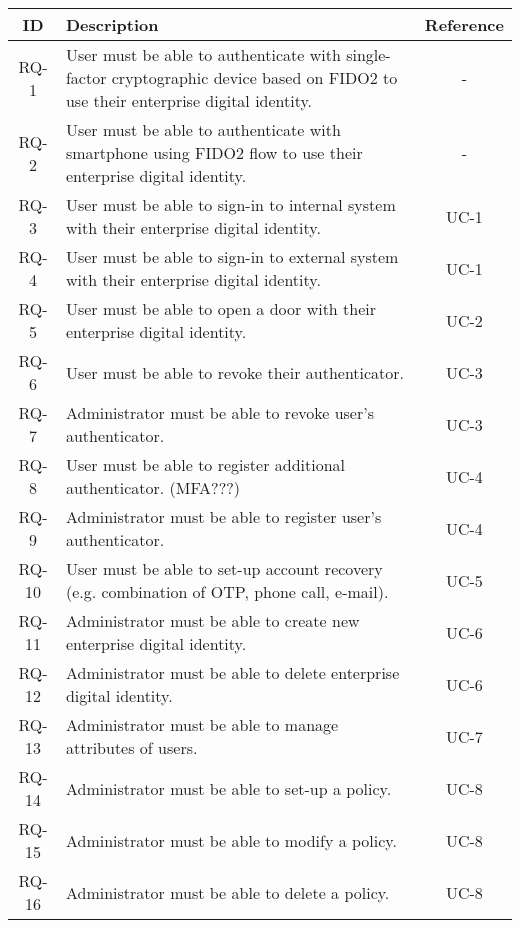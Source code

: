 \begin{table}[H]
    \onehalfspacing
    \centering
    \begin{tabular}{|c|p{12cm}|c|}
    \hline
    \cellcolor[HTML]{CBCEFB}\textbf{ID}&\cellcolor[HTML]{CBCEFB}\textbf{Description}&\cellcolor[HTML]{CBCEFB}\textbf{Reference}\\
    \hline
    RQ-1&User must be able to authenticate with single-factor cryptographic device based on FIDO2 to use their enterprise digital identity.&-\\
    \hline
    RQ-2&User must be able to authenticate with smartphone using FIDO2 flow to use their enterprise digital identity.&-\\
    \hline
    \hline
    RQ-3&User must be able to sign-in to internal system with their enterprise digital identity.&UC-1\\
    \hline
    RQ-4&User must be able to sign-in to external system with their enterprise digital identity.&UC-1\\
    \hline
    \hline
    RQ-5&User must be able to open a door with their enterprise digital identity.&UC-2\\
    \hline
    \hline
    RQ-6&User must be able to revoke their authenticator.&UC-3\\
    \hline
    RQ-7&Administrator must be able to revoke user’s authenticator.&UC-3\\
    \hline
    \hline
    RQ-8&User must be able to register additional authenticator. (MFA???)&UC-4\\
    \hline
    RQ-9&Administrator must be able to register user’s authenticator.&UC-4\\
    \hline
    RQ-10&User must be able to set-up account recovery (e.g. combination of OTP, phone call, e-mail).&UC-5\\
    \hline
    \hline
    RQ-11&Administrator must be able to create new enterprise digital identity.&UC-6\\
    \hline
    RQ-12&Administrator must be able to delete enterprise digital identity.&UC-6\\
    \hline
    \hline
    RQ-13&Administrator must be able to manage attributes of users.&UC-7\\
    \hline
    \hline
    RQ-14&Administrator must be able to set-up a policy.&UC-8\\
    \hline
    RQ-15&Administrator must be able to modify a policy.&UC-8\\
    \hline
    RQ-16&Administrator must be able to delete a policy.&UC-8\\

\end{tabular}
\end{table}

